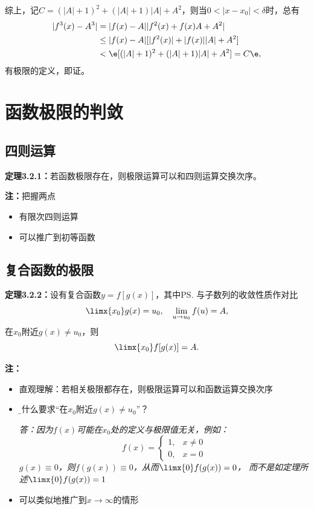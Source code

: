 综上，记$C=(|A|+1)^2+(|A|+1)|A|+A^2$，则当$0<|x-x_0|<\delta$时，总有
\begin{align}
	|f^3(x)-A^3|&=|f(x)-A||f^2(x)+f(x)A+A^2|\notag\\
	&\leq |f(x)-A|[|f^2(x)|+|f(x)||A|+A^2]\notag\\
	&<\e[(|A|+1)^2+(|A|+1)|A|+A^2]=C\e\notag,
\end{align}
有极限的定义，即证。

\section{函数极限的判敛}

\subsection{四则运算}

{\bf 定理3.2.1：}若函数极限存在，则极限运算可以和四则运算交换次序。

{\bf 注：}把握两点
\begin{itemize}
  \setlength{\itemindent}{1cm}
  \item 有限次四则运算
  \item 可以推广到初等函数
\end{itemize}

\subsection{复合函数的极限}

{\bf 定理3.2.2：}设有复合函数$y=f[g(x)]$，其中\ps{与子数列的收敛性质作对比}
$$\limx{x_0}g(x)=u_0,\quad\lim\limits_{u\to u_0}f(u)=A,$$
在$x_0$附近$g(x)\ne u_0$，则
$$\limx{x_0}f[g(x)]=A.$$

{\bf 注：}
\begin{itemize}
  \setlength{\itemindent}{1cm}
  \item 直观理解：若相关极限都存在，则极限运算可以和函数运算交换次序
  \item {\b 为什么要求“在$x_0$附近$g(x)\ne u_0$”？}
  
  {\it 答：因为$f(x)$可能在$x_0$处的定义与极限值无关，例如：
  $$f(x)=\left\{\begin{array}{ll}
  1,&x\ne0\\0,&x=0
  \end{array}\right.$$
  $g(x)\equiv 0$，则$f(g(x))\equiv0$，从而$\limx{0}f(g(x))=0$，
  而不是如定理所述$\limx{0}f(g(x))=1$}
  \item 可以类似地推广到$x\to\infty$的情形
\end{itemize}

